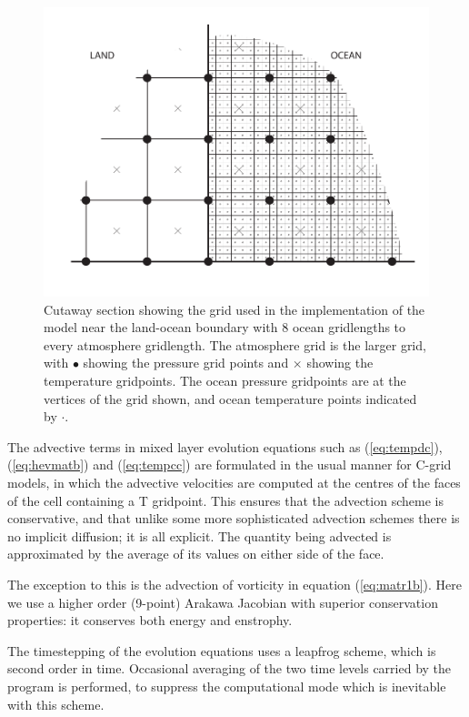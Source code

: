 \documentclass[11pt, a4paper,twoside]{article}
\numberwithin{equation}{section}
\begin{document}
\begin{figure}[!ht]
\includegraphics[width=\hsize]{ptgrid}
\caption{\small Cutaway section showing the grid used in the implementation of the model near the land-ocean boundary with 8 ocean gridlengths to every atmosphere gridlength.  The atmosphere grid is the larger grid, with $\bullet$ showing the pressure grid points and $\times$ showing the temperature gridpoints.  The ocean pressure gridpoints are at the vertices of the grid shown, and ocean temperature points indicated by $\cdot$. \label{fig:ptgrid}}
\end{figure}

The advective terms in mixed layer evolution equations such as (\ref{eq:tempdc}), (\ref{eq:hevmatb}) and (\ref{eq:tempcc}) are formulated in the usual manner for C-grid models, in which the advective velocities are computed at the centres of the faces of the cell containing a T gridpoint.
This ensures that the advection scheme is conservative, and that unlike some more sophisticated advection schemes there is no implicit diffusion; it is all explicit.
The quantity being advected is approximated by the average of its values on either side of the face.

The exception to this is the advection of vorticity in equation (\ref{eq:matr1b}).
Here we use a higher order (9-point) Arakawa Jacobian \citep{arakawa:81} with superior conservation properties: it conserves both energy and enstrophy.

The timestepping of the evolution equations uses a leapfrog scheme, which is second order in time.
Occasional averaging of the two time levels carried by the program is performed, to suppress the computational mode which is inevitable with this scheme.
\end{document}
